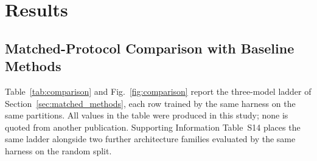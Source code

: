 \documentclass[fleqn,10pt]{wlscirep}
\begin{document}
\section{Results}
\label{sec:results}

\begingroup\color{red}
\subsection{Matched-Protocol Comparison with Baseline Methods}
\label{sec:matched}

Table~\ref{tab:comparison} and Fig.~\ref{fig:comparison} report the
three-model ladder of Section~\ref{sec:matched_methods}, each row trained by the
same harness on the same partitions.  All values in the table were produced in
this study; none is quoted from another publication.  Supporting Information
Table~S14 places the same ladder alongside two further architecture families
evaluated by the same harness on the random split.

\begin{table}[htbp]
\centering
\caption{Matched-protocol comparison on the Davis dataset (binary
  classification, $K_d < \SI{30}{nM}$).  Every model was trained in this study
  under one shared partition, seed, optimiser, schedule, loss and
  validation-selected threshold; no value is quoted from another publication.
  ``PLM'' indicates whether the model consumes the frozen
  \texttt{esm2\_t30\_150M\_UR50D} residue representation used by BioInteract.
  Best value in each column is in \textbf{bold}.  The Drug-ID-held-out columns
  are shown for completeness but are not used to rank the models: the shared
  early-stopping patience halted every run on that protocol at a first-epoch
  checkpoint (Section~\ref{sec:matched}).  Per-run provenance is given in
  Supporting Information Table~S16.}
\label{tab:comparison}
\end{table}
\end{document}
